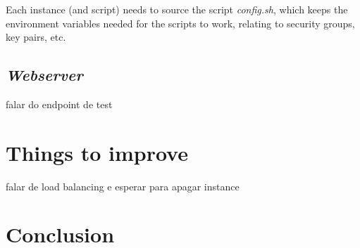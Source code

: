 \documentclass{article}
\begin{document}
Each instance (and script) needs to source the script \textit{config.sh}, which
keeps the environment variables needed for the scripts to work, relating to
security groups, key pairs, etc.

\subsection{\textit{Webserver}}

falar do endpoint de test

\section{Things to improve}

falar de load balancing e esperar para apagar instance

\section{Conclusion}
\end{document}
